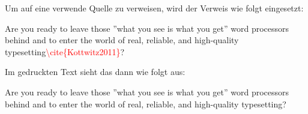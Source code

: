 
Um auf eine verwende Quelle zu verweisen, wird der Verweis wie folgt eingesetzt:

\begin{tcolorbox}[width=\textwidth,colback={light-gray},title={Latex-Text},colbacktitle=gray,coltitle=white]

Are you ready to leave those ''what you see is what you get'' word processors behind and to enter the world of real, reliable, and high-quality typesetting\textcolor{red}{\textbackslash{cite\{Kottwitz2011\}}}?

\end{tcolorbox}

Im gedruckten Text sieht das dann wie folgt aus:

\begin{tcolorbox}[width=\textwidth,colback={light-gray},title={Print-Text},colbacktitle=gray,coltitle=white]

Are you ready to leave those ''what you see is what you get'' word processors behind and to enter the world of real, reliable, and high-quality typesetting\cite{Kottwitz2011}?

\end{tcolorbox}
